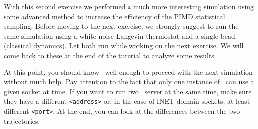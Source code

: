 \documentclass{article}
\begin{document}
With this second exercise we performed a much more interesting
simulation using some advanced method to increase the efficiency of
the PIMD statistical sampling. Before moving to the next exercise, we
strongly suggest to run the same simulation using a white noise Langevin
thermostat and a single bead (classical dynamics).  Let both run while
working on the next exercise. We will come back to these at the end of
the tutorial to analyze some results.

At this point, you should know \ipi\ well enough to
proceed with the next simulation without much help. Pay attention to
the fact that only one instance of \ipi\ can use a given socket at
time. If you want to run two \ipi\ server at the same time, make sure
they have a different \texttt{<address>} or, in the case of INET domain
sockets, at least different \texttt{<port>}. At the end, you can look
at the differences between the two trajectories.

\vspace{2em}
\end{document}
